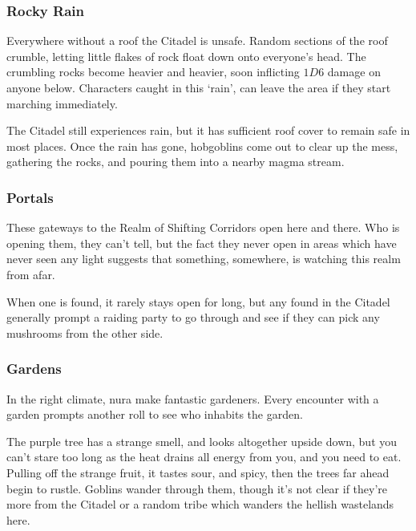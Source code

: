 \begin{multicols}{2}
\subsubsection{Rocky Rain}

Everywhere without a roof the Citadel is unsafe.
Random sections of the roof crumble, letting little flakes of rock float down onto everyone's head.
The crumbling rocks become heavier and heavier, soon inflicting $1D6$ damage on anyone below.
Characters caught in this `rain', can leave the area if they start marching immediately.

The Citadel still experiences rain, but it has sufficient roof cover to remain safe in most places.
Once the rain has gone, hobgoblins come out to clear up the mess, gathering the rocks, and pouring them into a nearby magma stream.

\subsubsection{Portals}

These gateways to the Realm of Shifting Corridors open here and there.
Who is opening them, they can't tell, but the fact they never open in areas which have never seen any light suggests that something, somewhere, is watching this realm from afar.

When one is found, it rarely stays open for long, but any found in the Citadel generally prompt a raiding party to go through and see if they can pick any mushrooms from the other side.

\subsubsection{Gardens}

In the right climate, nura make fantastic gardeners.
Every encounter with a garden prompts another roll to see who inhabits the garden.

\begin{boxtext}

  The purple tree has a strange smell, and looks altogether upside down, but you can't stare too long as the heat drains all energy from you, and you need to eat.
Pulling off the strange fruit, it tastes sour, and spicy, then the trees far ahead begin to rustle.
Goblins wander through them, though it's not clear if they're more from the Citadel or a random tribe which wanders the hellish wastelands here.

\end{boxtext}


\end{multicols}
